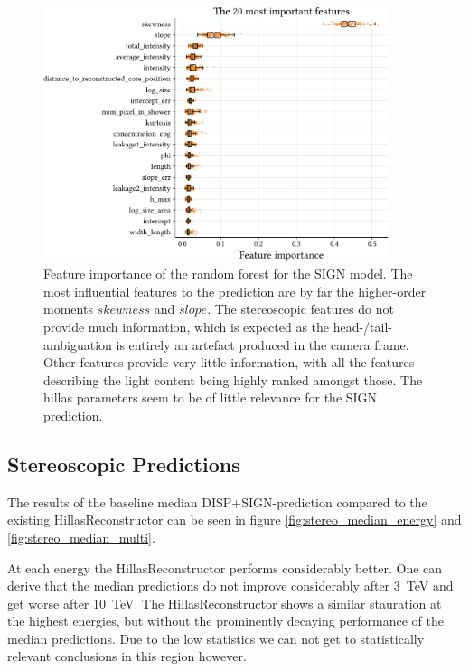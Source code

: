 \begin{figure}
	\centering
    \captionsetup{width=0.9\linewidth}
	\includegraphics[width=0.9\textwidth]{../analysis/plots/sign_features.pdf}
	\caption{Feature importance of the random forest for the SIGN model.
	        The most influential features to the prediction are by far the higher-order moments $skewness$
            and $slope$. The stereoscopic features do not provide much information,
            which is expected as the head-/tail-ambiguation is entirely an artefact produced
            in the camera frame. Other features provide very little information, with all
            the features describing the light content being highly ranked amongst those.
            The hillas parameters seem to be of little relevance for the SIGN prediction.}
	\label{fig:sign_features}
\end{figure}




\subsection{Stereoscopic Predictions}

The results of the baseline median DISP+SIGN-prediction
compared to the existing HillasReconstructor can be seen in figure \ref{fig:stereo_median_energy}
and \ref{fig:stereo_median_multi}.

At each energy the HillasReconstructor performs considerably better.
One can derive that the median predictions do not improve considerably after
\SI{3}{\tera\electronvolt} and get worse after \SI{10}{\tera\electronvolt}.
The HillasReconstructor shows a similar stauration at the highest energies,
but without the prominently decaying performance of the median predictions.
Due to the low statistics we can not get to statistically relevant
conclusions in this region however.

